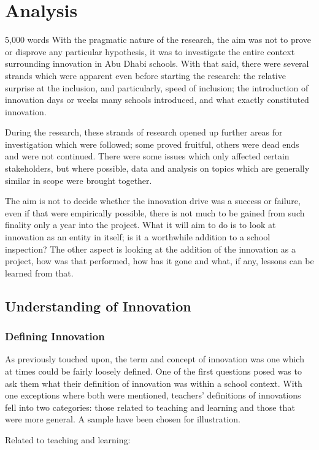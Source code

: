 \section{Analysis}
5,000 words
With the pragmatic nature of the research, the aim was not to prove or disprove any particular hypothesis, it was to investigate the entire context surrounding innovation in Abu Dhabi schools. With that said, there were several strands which were apparent even before starting the research: the relative surprise at the inclusion, and particularly, speed of inclusion; the introduction of innovation days or weeks many schools introduced, and what exactly constituted innovation.

During the research, these strands of research opened up further areas for investigation which were followed; some proved fruitful, others were dead ends and were not continued. There were some issues which only affected certain stakeholders, but where possible, data and analysis on topics which are generally similar in scope were brought together.

The aim is not to decide whether the innovation drive was a success or failure, even if that were empirically possible, there is not much to be gained from such finality only a year into the project. What it will aim to do is to look at innovation as an entity in itself; is it a worthwhile addition to a school inspection? The other aspect is looking at the addition of the innovation as a project, how was that performed, how has it gone and what, if any, lessons can be learned from that.

\subsection{Understanding of Innovation}
\subsubsection{Defining Innovation}
As previously touched upon, the term and concept of innovation was one which at times could be fairly loosely defined. One of the first questions posed was to ask them what their definition of innovation was within a school context. With one exceptions where both were mentioned, teachers' definitions of innovations fell into two categories: those related to teaching and learning and those that were more general. A sample have been chosen for illustration.

Related to teaching and learning: 


